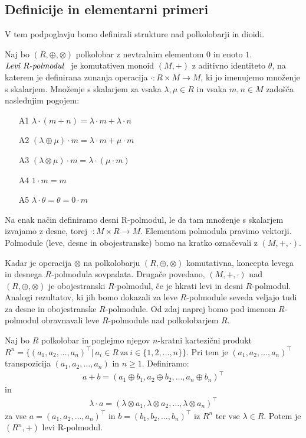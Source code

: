 \documentclass[mat1]{fmfdelo}
\newcommand{\pojem}[1]{\ensuremath{\emph{#1}}}
\newcommand{\map}[3]{\ensuremath{{#1}:{#2}\rightarrow{#3}}}
\begin{document}
\subsection{Definicije in elementarni primeri} \label{subsect:semimoduledef}
V tem podpoglavju bomo definirali stru\-kture nad polkolobarji in dioidi.

\begin{definicija}\label{def:polmodul}
	Naj bo $(R, \oplus, \otimes)$ polkolobar z nevtralnim elementom $0$ in enoto $1$.\pojem{Levi $R$-polmodul}~ je komutativen monoid $(M, +)$ z aditivno identiteto $\theta$, na katerem je definirana zunanja operacija \map{\cdot}{R\times M}{M}, ki jo imenujemo množenje s skalarjem. Množenje s skalarjem za vsaka $\lambda,\mu\in R$ in vsaka $m, n\in M$ zadošča naslednjim pogojem:
	\begin{enumerate}
		\item[A1] $\lambda\cdot(m + n) = \lambda\cdot m + \lambda\cdot n$
		\item[A2] $(\lambda \oplus \mu)\cdot m = \lambda\cdot m + \mu\cdot m$
		\item[A3]  $(\lambda\otimes\mu) \cdot m = \lambda \cdot (\mu \cdot m)$
		\item[A4] $1\cdot m = m$
		\item[A5] $\lambda\cdot\theta = \theta = 0\cdot m$
	\end{enumerate}

Na enak način definiramo desni R-polmodul, le da tam množenje s skalarjem izvajamo z desne, torej \map{\cdot}{M\times R}{M}. Elementom polmodula pravimo vektorji. Polmodule (leve, desne in obojestranske) bomo na kratko označevali z $(M, +, \cdot)$.
\end{definicija}

	 Kadar je operacija $\otimes$ na polkolobarju $(R,\oplus, \otimes)$ komutativna, koncepta levega in desnega $R$-polmodula sovpadata. Drugače povedano, $(M, +, \cdot)$ nad $(R, \oplus, \otimes)$ je obojestranski $R$-polmodul, če je hkrati levi in desni $R$-polmodul. Analogi rezultatov, ki jih bomo dokazali za leve $R$-polmodule seveda veljajo  tudi za desne in obojestranske $R$-polmodule. Od zdaj naprej bomo pod imenom $R$-polmodul obravnavali leve $R$-polmodule nad polkolobarjem $R$.

\begin{zgled}
	\label{zgled:Rnpolmodul}
	Naj bo $R$ polkolobar in poglejmo njegov $n$-kratni kartezični produkt $R^n = \{(a_1, a_2, \ldots, a_n)^{\top} |~ a_i \in R~\text{za}~i\in \{1, 2, \ldots, n\}\}$. Pri tem je $(a_1, a_2, \ldots, a_n)^{\top}$ transpozicija $(a_1, a_2, \ldots, a_n)$ in $n\geq 1$. Definiramo:
	\begin{align*}
		a + b = (a_1 \oplus b_1, a_2 \oplus b_2, \ldots, a_n \oplus b_n)^{\top}
	\end{align*}
	in
	\begin{align*}
		\lambda\cdot a = (\lambda\otimes a_1,\lambda\otimes a_2, \ldots,\lambda\otimes a_n)^{\top}
	\end{align*}
	za vse $a = (a_1, a_2, \ldots, a_n)^{\top}$ in $b = (b_1, b_2, \ldots, b_n)^{\top}$ iz $R^n$ ter vse $\lambda \in R$. Potem je $(R^n, +)$ levi R-polmodul.
\end{zgled}
\end{document}
